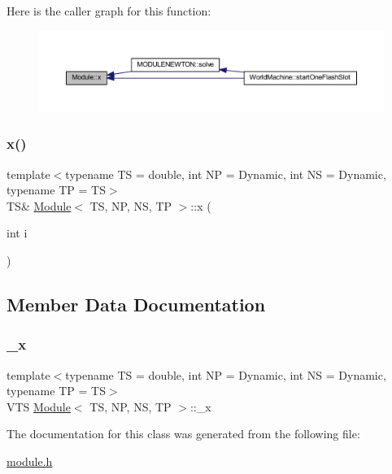 Here is the caller graph for this function\+:
\nopagebreak
\begin{figure}[H]
\begin{center}
\leavevmode
\includegraphics[width=350pt]{class_module_a923f4a0593063f6df53e165cc1db4891_icgraph}
\end{center}
\end{figure}
\mbox{\label{class_module_a3f448820efd272b2812e0ccc697c42de}} 
\subsubsection{\texorpdfstring{x()}{x()}\hspace{0.1cm}{\footnotesize\ttfamily [2/2]}}
{\footnotesize\ttfamily template$<$typename TS = double, int NP = Dynamic, int NS = Dynamic, typename TP = TS$>$ \\
TS\& \mbox{\hyperlink{class_module}{Module}}$<$ TS, NP, NS, TP $>$\+::x (\begin{DoxyParamCaption}\item[{int}]{i }\end{DoxyParamCaption})\hspace{0.3cm}{\ttfamily [inline]}}



\subsection{Member Data Documentation}
\mbox{\label{class_module_a518d0262a48d4bc3647adddefd66897d}} 
\subsubsection{\texorpdfstring{\+\_\+x}{\_x}}
{\footnotesize\ttfamily template$<$typename TS = double, int NP = Dynamic, int NS = Dynamic, typename TP = TS$>$ \\
V\+TS \mbox{\hyperlink{class_module}{Module}}$<$ TS, NP, NS, TP $>$\+::\+\_\+x\hspace{0.3cm}{\ttfamily [protected]}}



The documentation for this class was generated from the following file\+:\begin{DoxyCompactItemize}
\item 
\mbox{\hyperlink{module_8h}{module.\+h}}\end{DoxyCompactItemize}
